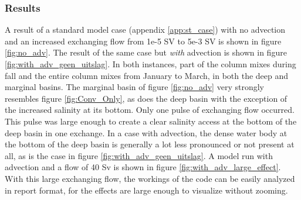 \documentclass[twocolumn]{article}
\begin{document}
\subsubsection{Results}
A result of a standard model case (appendix \ref{app:st_case}) with no advection and an increased exchanging flow from 1e-5 SV to 5e-3 SV is shown in figure \ref{fig:no_adv}. The result of the same case but \textit{with} advection is shown in figure \ref{fig:with_adv_geen_uitslag}. In both instances, part of the column mixes during fall and the entire column mixes from January to March, in both the deep and marginal basins. The marginal basin of figure \ref{fig:no_adv} very strongly resembles figure \ref{fig:Conv_Only}, as does the deep basin with the exception of the increased salinity at its bottom. Only one pulse of exchanging flow occurred. This pulse was large enough to create a clear salinity access at the bottom of the deep basin in one exchange.
In a case with advection, the dense water body at the bottom of the deep basin is generally a lot less pronounced or not present at all, as is the case in figure \ref{fig:with_adv_geen_uitslag}. A model run with advection and a flow of 40 Sv is shown in figure \ref{fig:with_adv_large_effect}. With this large exchanging flow, the workings of the code can be easily analyzed in report format, for the effects are large enough to visualize without zooming.%


\end{document}
